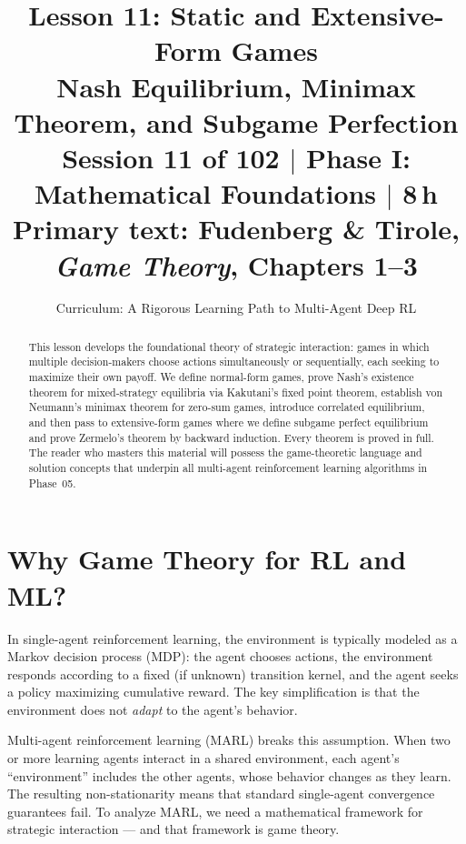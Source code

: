 \documentclass[11pt,a4paper]{article}
\title{\textbf{Lesson 11: Static and Extensive-Form Games}\\[10pt]
\large Nash Equilibrium, Minimax Theorem, and Subgame Perfection\\[5pt]
\normalsize Session 11 of 102 $\mid$ Phase I: Mathematical Foundations $\mid$ 8\,h\\
\normalsize Primary text: Fudenberg \& Tirole, \emph{Game Theory}, Chapters 1--3}
\author{Curriculum: A Rigorous Learning Path to Multi-Agent Deep RL}
\date{}
\theoremstyle{definition}
\theoremstyle{plain}
\theoremstyle{remark}
\begin{document}
\maketitle

\begin{abstract}
This lesson develops the foundational theory of strategic interaction: games in which
multiple decision-makers choose actions simultaneously or sequentially, each seeking to
maximize their own payoff. We define normal-form games, prove Nash's existence theorem
for mixed-strategy equilibria via Kakutani's fixed point theorem, establish
von Neumann's minimax theorem for zero-sum games, introduce correlated equilibrium,
and then pass to extensive-form games where we define subgame perfect equilibrium
and prove Zermelo's theorem by backward induction. Every theorem is proved in full.
The reader who masters this material will possess the game-theoretic language and
solution concepts that underpin all multi-agent reinforcement learning algorithms
in Phase~05.
\end{abstract}

\tableofcontents
\newpage

\section{Why Game Theory for RL and ML?}
\label{sec:intro}

In single-agent reinforcement learning, the environment is typically modeled as a
Markov decision process (MDP): the agent chooses actions, the environment responds
according to a fixed (if unknown) transition kernel, and the agent seeks a policy
maximizing cumulative reward. The key simplification is that the environment does
not \emph{adapt} to the agent's behavior.

Multi-agent reinforcement learning (MARL) breaks this assumption. When two or more
learning agents interact in a shared environment, each agent's ``environment'' includes
the other agents, whose behavior changes as they learn. The resulting non-stationarity
means that standard single-agent convergence guarantees fail. To analyze MARL, we need
a mathematical framework for strategic interaction --- and that framework is game theory.
\end{document}
